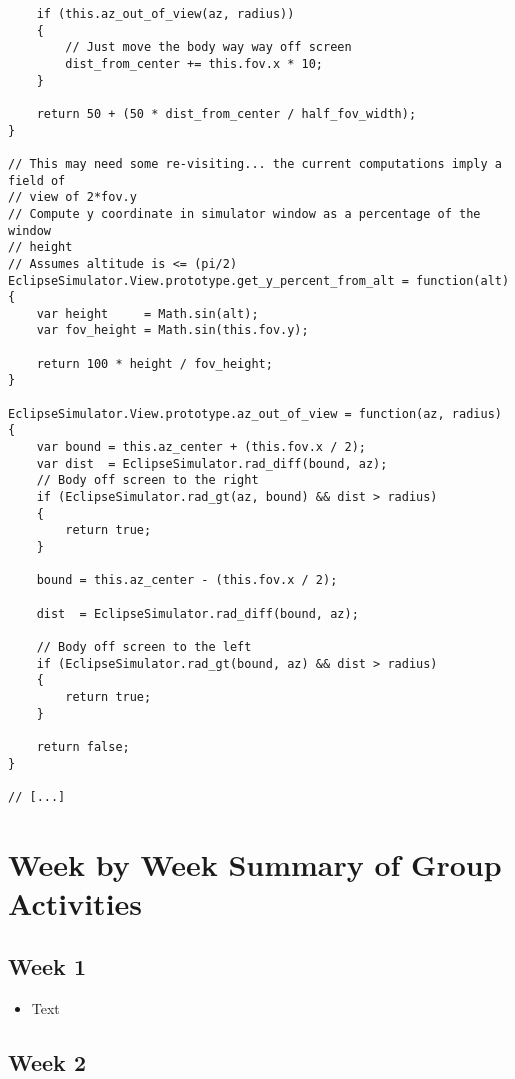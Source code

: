 \documentclass[10pt, onecolumn, draftclsnofoot, letterpaper, compsoc]{IEEEtran}
\begin{document}
\begin{verbatim}
    if (this.az_out_of_view(az, radius))
    {
        // Just move the body way way off screen
        dist_from_center += this.fov.x * 10;
    }

    return 50 + (50 * dist_from_center / half_fov_width);
}

// This may need some re-visiting... the current computations imply a field of
// view of 2*fov.y
// Compute y coordinate in simulator window as a percentage of the window
// height
// Assumes altitude is <= (pi/2)
EclipseSimulator.View.prototype.get_y_percent_from_alt = function(alt)
{
    var height     = Math.sin(alt);
    var fov_height = Math.sin(this.fov.y);

    return 100 * height / fov_height;
}

EclipseSimulator.View.prototype.az_out_of_view = function(az, radius)
{
    var bound = this.az_center + (this.fov.x / 2);
    var dist  = EclipseSimulator.rad_diff(bound, az);
    // Body off screen to the right
    if (EclipseSimulator.rad_gt(az, bound) && dist > radius)
    {
        return true;
    }

    bound = this.az_center - (this.fov.x / 2);

    dist  = EclipseSimulator.rad_diff(bound, az);

    // Body off screen to the left
    if (EclipseSimulator.rad_gt(bound, az) && dist > radius)
    {
        return true;
    }

    return false;
}

// [...]
\end{verbatim}

\section{Week by Week Summary of Group Activities}

\subsection{Week 1}

\begin{itemize}

\item Text

\end{itemize}

\subsection{Week 2}
\end{document}
